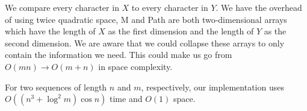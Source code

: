 \documentclass{tufte-handout}
\begin{document}
We compare every character in $X$ to every character in $Y$.
We have the overhead of using twice quadratic space, M and Path are both two-dimensional arrays which have the length of $X$ as the first dimension and the length of $Y$ as the second dimension. We are aware that we could collapse these arrays to only contain the information we need.
This could make us go from $O(m n) \rightarrow O(m+n)$ in space complexity.

  For two sequences of length $n$ and $m$, respectively, our implementation uses $O((n^3+\log^2 m)\cos n)$ time and
  $O(1)$ space.
\end{document}
